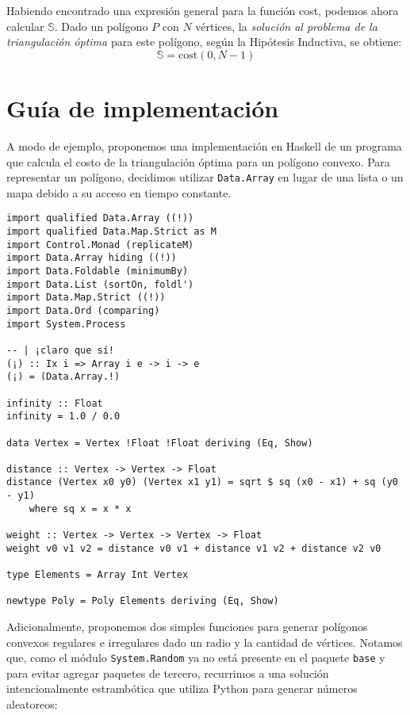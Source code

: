 \documentclass[tiny]{corsage}
\newcommand{\cost}[1]{\text{cost}(#1)}
\theoremstyle{plain}
\theoremstyle{definition}
\begin{document}
	Habiendo encontrado una expresión general para la función cost, podemos ahora calcular $\mathbb{S}$.  Dado un polígono $P$ con $N$ vértices, la \emph{solución al problema de la triangulación óptima} para este polígono, según la Hipótesis Inductiva, se obtiene:
	\[ \mathbb{S} = \cost{0, N - 1}\]

\section{Guía de implementación}
	A modo de ejemplo, proponemos una implementación en Haskell de un programa que calcula el costo de la triangulación óptima para un polígono convexo.  Para representar un polígono, decidimos utilizar \texttt{Data.Array} en lugar de una lista o un mapa debido a su acceso en tiempo constante.

	\begin{verbatim}
import qualified Data.Array ((!))
import qualified Data.Map.Strict as M
import Control.Monad (replicateM)
import Data.Array hiding ((!))
import Data.Foldable (minimumBy)
import Data.List (sortOn, foldl')
import Data.Map.Strict ((!))
import Data.Ord (comparing)
import System.Process

-- | ¡claro que sí!
(¡) :: Ix i => Array i e -> i -> e
(¡) = (Data.Array.!)

infinity :: Float
infinity = 1.0 / 0.0

data Vertex = Vertex !Float !Float deriving (Eq, Show)

distance :: Vertex -> Vertex -> Float
distance (Vertex x0 y0) (Vertex x1 y1) = sqrt $ sq (x0 - x1) + sq (y0 - y1)
	where sq x = x * x

weight :: Vertex -> Vertex -> Vertex -> Float
weight v0 v1 v2 = distance v0 v1 + distance v1 v2 + distance v2 v0

type Elements = Array Int Vertex

newtype Poly = Poly Elements deriving (Eq, Show)
	\end{verbatim}

	Adicionalmente, proponemos dos simples funciones para generar polígonos convexos regulares e irregulares dado un radio y la cantidad de vértices.  Notamos que, como el módulo \texttt{System.Random} ya no está presente en el paquete \texttt{base} y para evitar agregar paquetes de tercero, recurrimos a una solución intencionalmente estrambótica que utiliza Python para generar números aleatoreos:
\end{document}
